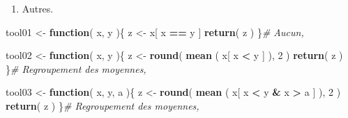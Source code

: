 \documentclass[
  11pt,
  french,
]{article}
\newenvironment{Shaded}{\begin{snugshade}}{\end{snugshade}}
\newcommand{\CommentTok}[1]{\textcolor[rgb]{0.56,0.35,0.01}{\textit{#1}}}
\newcommand{\ControlFlowTok}[1]{\textcolor[rgb]{0.13,0.29,0.53}{\textbf{#1}}}
\newcommand{\DecValTok}[1]{\textcolor[rgb]{0.00,0.00,0.81}{#1}}
\newcommand{\KeywordTok}[1]{\textcolor[rgb]{0.13,0.29,0.53}{\textbf{#1}}}
\newcommand{\NormalTok}[1]{#1}
\newcommand{\OperatorTok}[1]{\textcolor[rgb]{0.81,0.36,0.00}{\textbf{#1}}}
\newcommand{\StringTok}[1]{\textcolor[rgb]{0.31,0.60,0.02}{#1}}
\providecommand{\tightlist}{%
  \setlength{\itemsep}{0pt}\setlength{\parskip}{0pt}}
\begin{document}
\begin{Shaded}
\end{Shaded}

\begin{enumerate}
\def\labelenumi{\arabic{enumi}.}
\setcounter{enumi}{7}
\tightlist
\item
  Autres.
\end{enumerate}

\begin{Shaded}
\begin{Highlighting}[]
\NormalTok{tool01 <-}\StringTok{ }\ControlFlowTok{function}\NormalTok{( x, y )\{}
\NormalTok{  z <-}\StringTok{ }\NormalTok{x[ x }\OperatorTok{==}\StringTok{ }\NormalTok{y ]}
  \KeywordTok{return}\NormalTok{( z )}
\NormalTok{\}}\CommentTok{# Aucun,}

\NormalTok{tool02 <-}\StringTok{ }\ControlFlowTok{function}\NormalTok{( x, y )\{}
\NormalTok{  z <-}\StringTok{ }\KeywordTok{round}\NormalTok{( }\KeywordTok{mean}\NormalTok{ ( x[ x }\OperatorTok{<}\StringTok{ }\NormalTok{y ] ),}
              \DecValTok{2}\NormalTok{ )}
  \KeywordTok{return}\NormalTok{( z )}
\NormalTok{\}}\CommentTok{# Regroupement des moyennes,}

\NormalTok{tool03 <-}\StringTok{ }\ControlFlowTok{function}\NormalTok{( x, y, a )\{}
\NormalTok{  z <-}\StringTok{ }\KeywordTok{round}\NormalTok{( }\KeywordTok{mean}\NormalTok{ ( x[ x }\OperatorTok{<}\StringTok{ }\NormalTok{y }\OperatorTok{&}\StringTok{ }\NormalTok{x }\OperatorTok{>}\StringTok{ }\NormalTok{a ] ),}
              \DecValTok{2}\NormalTok{ )}
  \KeywordTok{return}\NormalTok{( z )}
\NormalTok{\}}\CommentTok{# Regroupement des moyennes,}
\end{Highlighting}
\end{Shaded}
\end{document}
